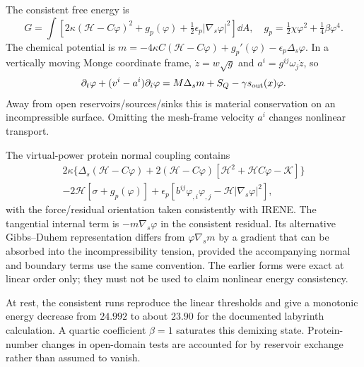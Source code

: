 The consistent free energy is
\begin{equation}
G=\int[2\kappa(\mathcal H-C\varphi)^2+g_p(\varphi)+\tfrac12\epsilon_p|\nabla_s\varphi|^2]\dd A,
\quad g_p=\tfrac12\chi\varphi^2+\tfrac14\beta\varphi^4 .
\end{equation}
The chemical potential is $m=-4\kappa C(\mathcal H-C\varphi)+g_p'(\varphi)-\epsilon_p\Delta_s\varphi$. In a vertically moving Monge coordinate frame, $\dot z=w\sqrt g$ and $a^i=g^{ij}\omega_j\dot z$, so
\begin{equation}
\partial_t\varphi+(v^i-a^i)\partial_i\varphi=M\Delta_s m+S_Q-\gamma s_{\rm out}(x)\varphi .
\end{equation}
Away from open reservoirs/sources/sinks this is material conservation on an incompressible surface. Omitting the mesh-frame velocity $a^i$ changes nonlinear transport.

The virtual-power protein normal coupling contains
\begin{multline}
2\kappa\{\Delta_s(\mathcal H-C\varphi)+2(\mathcal H-C\varphi)
[\mathcal H^2+\mathcal H C\varphi-\mathcal K]\}\\
-2\mathcal H[\sigma+g_p(\varphi)]
+\epsilon_p[b^{ij}\varphi_{,i}\varphi_{,j}-\mathcal H|\nabla_s\varphi|^2],
\end{multline}
with the force/residual orientation taken consistently with IRENE. The tangential internal term is $-m\nabla_s\varphi$ in the consistent residual. Its alternative Gibbs--Duhem representation differs from $\varphi\nabla_s m$ by a gradient that can be absorbed into the incompressibility tension, provided the accompanying normal and boundary terms use the same convention. The earlier forms were exact at linear order only; they must not be used to claim nonlinear energy consistency.

At rest, the consistent runs reproduce the linear thresholds and give a monotonic energy decrease from $24.992$ to about $23.90$ for the documented labyrinth calculation. A quartic coefficient $\beta=1$ saturates this demixing state. Protein-number changes in open-domain tests are accounted for by reservoir exchange rather than assumed to vanish.

